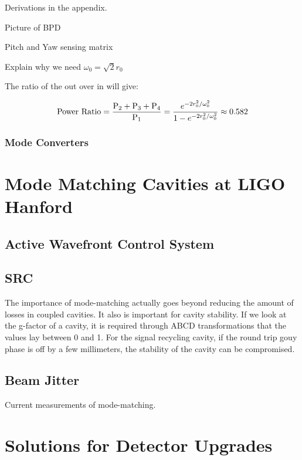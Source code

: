 \documentclass[oneside]{book}
\begin{document}
		Derivations in the appendix.
		
		Picture of BPD
		
		Pitch and Yaw sensing matrix
		
		Explain why we need $\omega_{0} = \sqrt{2} r_0$
		
		The ratio of the out over in will give:
		
		\begin{equation}
		\text{Power Ratio} = \frac{\text{P}_2 + \text{P}_3 + \text{P}_4}{\text{P}_1}  \\
		= \frac{e^{-2r_0^2/ \omega_{0}^2}} {1 - e^{-2r_0^2/ \omega_{0}^2 }} \approx 0.582
		\end{equation}
		
		\subsection{Mode Converters}
		
		
		

\chapter{Mode Matching Cavities at LIGO Hanford}

	\section{Active Wavefront Control System}
	
	\section{SRC}
	The importance of mode-matching actually goes beyond reducing the amount of losses in coupled cavities.  It also is important for cavity stability.  If we look at the g-factor of a cavity, it is required through ABCD transformations that the values lay between 0 and 1.  For the signal recycling cavity, if the round trip gouy phase is off by a few millimeters, the stability of the cavity can be compromised. 
	
	
	\section{Beam Jitter}
	
	Current measurements of mode-matching.


\chapter{Solutions for Detector Upgrades}
\end{document}
